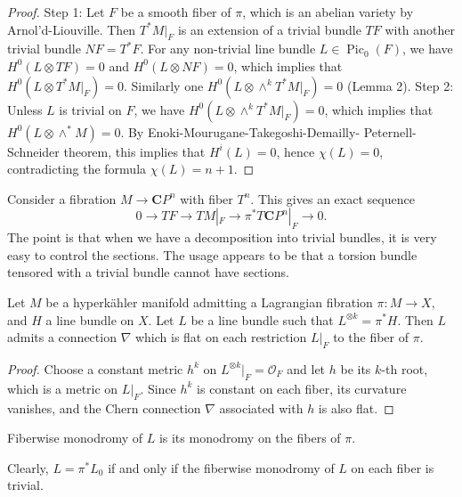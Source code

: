 \begin{proof}
Step 1: Let \(F\) be a smooth fiber of
\(\pi\), which is an abelian variety by
Arnol'd-Liouville. Then \(T^*M|_F\) is an
extension of a trivial bundle \(TF\) with
another trivial bundle \(NF = T^*F\). For
any non-trivial line bundle
\(L \in \operatorname{Pic}_0(F)\), we have
\(H^0(L\otimes TF)=0\) and
\(H^0(L\otimes NF)=0\), which implies that
\(H^0(L\otimes T^*M|_F)=0\). Similarly one
\(H^0(L\otimes \wedge^k T^*M|_F)=0\)
(Lemma 2).
Step 2: Unless \(L\) is trivial on \(F\), we
have \(H^0(L\otimes \wedge^k T^*M|_F)=0\),
which implies that \(H^0(L\otimes \wedge^*M)
=0\). By Enoki-Mourugane-Takegoshi-Demailly-
Peternell-Schneider theorem, this implies
that \(H^i(L)=0\), hence \(\chi(L)=0\),
contradicting the formula \(\chi(L)=n+1\).
\end{proof}

Consider a fibration \(M \to \mathbf{C}P^n\)
with fiber \(T^n\). This gives an exact
sequence
\[
0 \to TF \to TM|_F \to \pi^*T\mathbf{C}P^n|_F
\to 0.
\]
The point is that when we have a
decomposition into trivial bundles, it is
very easy to control the sections.
The usage appears to be that a torsion
bundle tensored with a trivial bundle cannot
have sections.

\begin{proposition}
\label{proposition-fiberwise-monodromy-line-bundle}
Let \(M\) be a hyperk\"ahler manifold
admitting a Lagrangian fibration
\(\pi : M \to X\), and \(H\) a line bundle on
\(X\). Let \(L\) be a line bundle such
that \(L^{\otimes k} = \pi^*H\). Then \(L\)
admits a connection \(\nabla\) which is flat
on each restriction \(L|_F\) to the fiber of
\(\pi\).
\end{proposition}

\begin{proof}
Choose a constant metric \(h^k\) on
\(L^{\otimes k}|_F = \mathcal{O}_F\) and let
\(h\) be its \(k\)-th root, which is a metric
on \(L|_F\). Since \(h^k\) is constant on
each fiber, its curvature vanishes, and the
Chern connection \(\nabla\) associated with
\(h\) is also flat.
\end{proof}

\begin{definition}
\label{definition-fiberwise-monodromy}
Fiberwise monodromy of \(L\) is its
monodromy on the fibers of \(\pi\).
\end{definition}

\begin{remark}
\label{remark-pullback-monodromy}
Clearly, \(L = \pi^*L_0\) if and only if the
fiberwise monodromy of \(L\) on each fiber
is trivial.
\end{remark}

